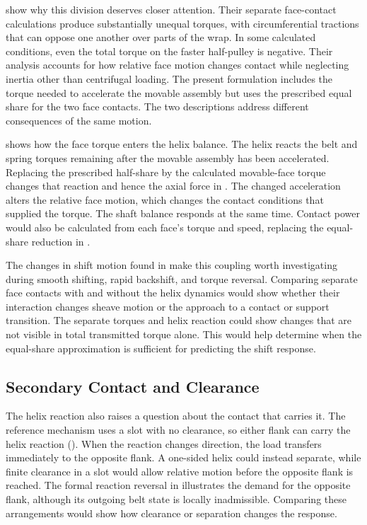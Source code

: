 \documentclass[11pt]{report}
\numberwithin{equation}{section}
\begin{document}
\citet{SorgeCammalleri2011} show why this division deserves closer attention.
Their separate face-contact calculations produce substantially unequal
torques, with circumferential tractions that can oppose one another over parts
of the wrap. In some calculated conditions, even the total torque on the
faster half-pulley is negative. Their analysis accounts for how relative face
motion changes contact while neglecting inertia other than centrifugal
loading. The present formulation includes the torque needed to accelerate the
movable assembly but uses the prescribed equal share for the two face
contacts. The two descriptions address different consequences of the same
motion.

 shows how the face torque
enters the helix balance. The helix reacts the belt and spring torques
remaining after the movable assembly has been accelerated. Replacing the
prescribed half-share by the calculated movable-face torque changes that
reaction and hence the axial force in .
The changed acceleration alters the relative face motion, which changes the
contact conditions that supplied the torque. The shaft balance responds at the
same time. Contact power would also be calculated from each face's torque and
speed, replacing the equal-share reduction in
.

The changes in shift motion found in  make
this coupling worth investigating during smooth shifting, rapid backshift, and
torque reversal. Comparing separate face contacts with and without the helix
dynamics would show whether their interaction changes sheave motion or the
approach to a contact or support transition. The separate torques and helix
reaction could show changes that are not visible in total transmitted torque
alone. This would help determine when the equal-share approximation is
sufficient for predicting the shift response.

\subsection*{Secondary Contact and Clearance}
\label{sec:future_work_secondary_contact}

The helix reaction also raises a question about the contact that carries it.
The reference mechanism uses a slot with no clearance, so either flank can
carry the helix reaction (). When the
reaction changes direction, the load transfers immediately to the opposite
flank. A one-sided helix could instead separate, while finite clearance in a
slot would allow relative motion before the opposite flank is reached.
The formal reaction reversal in  illustrates the demand for the opposite flank, although its outgoing belt state is locally inadmissible. Comparing these arrangements would show how clearance or separation changes the response.
\end{document}
